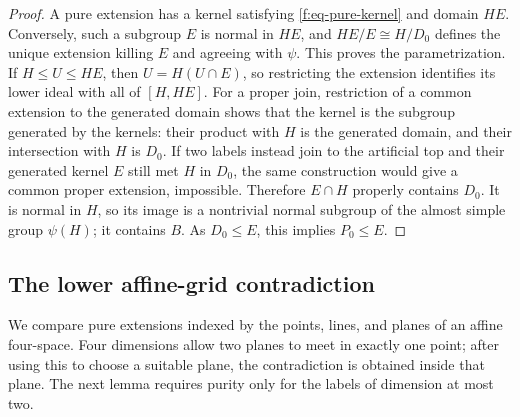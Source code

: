 \begin{proof}
A pure extension has a kernel satisfying \eqref{f:eq-pure-kernel} and
domain $HE$. Conversely, such a subgroup $E$ is normal in $HE$, and
$HE/E\cong H/D_0$ defines the unique extension killing $E$ and agreeing with
$\psi$. This proves the parametrization. If $H\le U\le HE$, then
$U=H(U\cap E)$, so restricting the extension identifies its lower ideal
with all of $[H,HE]$.
For a proper join, restriction of a common extension to the generated
domain shows that the kernel is the subgroup generated by the kernels:
their product with $H$ is the generated domain, and their intersection
with $H$ is $D_0$. If two labels instead join to the artificial top and
their generated kernel $E$ still met $H$ in $D_0$, the same construction
would give a common proper extension, impossible. Therefore $E\cap H$
properly contains $D_0$. It is normal in $H$, so its image is a nontrivial
normal subgroup of the almost simple group $\psi(H)$; it contains $B$.
As $D_0\le E$, this implies $P_0\le E$.
\end{proof}

\subsection{The lower affine-grid contradiction}

We compare pure extensions indexed by the points, lines, and planes of
an affine four-space. Four dimensions allow two planes to meet in exactly
one point; after using this to choose a suitable plane, the contradiction
is obtained inside that plane. The next lemma requires purity only for
the labels of dimension at most two.

